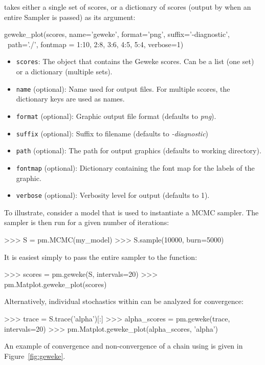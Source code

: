 \documentclass[]{jss}
\begin{document}
 takes either a single set of scores, or a dictionary of scores (output by  when an entire Sampler is passed) as its argument:
\begin{CodeInput}
geweke_plot(scores, name='geweke', format='png', suffix='-diagnostic', \
            path='./', fontmap = {1:10, 2:8, 3:6, 4:5, 5:4}, verbose=1)
\end{CodeInput}
\begin{itemize}

\item \verb=scores=: The object that contains the Geweke scores. Can be a list (one set) or a dictionary (multiple sets).

\item \verb=name= (optional): Name used for output files. For multiple scores, the dictionary keys are used as names.

\item \verb=format= (optional): Graphic output file format (defaults to \emph{png}).

\item \verb=suffix= (optional): Suffix to filename (defaults to \emph{-diagnostic})

\item \verb=path= (optional): The path for output graphics (defaults to working directory).

\item \verb=fontmap= (optional): Dictionary containing the font map for the labels of the graphic.

\item \verb=verbose= (optional): Verbosity level for output (defaults to 1).
\end{itemize}

To illustrate, consider a model  that is used to instantiate a MCMC sampler. The sampler is then run for a given number of iterations:
\begin{CodeInput}
>>> S = pm.MCMC(my_model)
>>> S.sample(10000, burn=5000)
\end{CodeInput}
It is easiest simply to pass the entire sampler  to the  function:
\begin{CodeInput}
>>> scores = pm.geweke(S, intervals=20)
>>> pm.Matplot.geweke_plot(scores)
\end{CodeInput}
Alternatively, individual stochastics within  can be analyzed for convergence:
\begin{CodeInput}
>>> trace = S.trace('alpha')[:]
>>> alpha_scores = pm.geweke(trace, intervals=20)
>>> pm.Matplot.geweke_plot(alpha_scores, 'alpha')
\end{CodeInput}
An example of convergence and non-convergence of a chain using  is given in Figure~\ref{fig:geweke}. 
\end{document}
